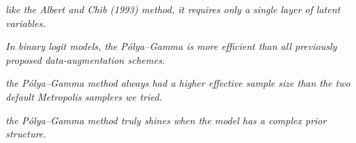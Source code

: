 \documentclass[12pt]{article}
\begin{document}
\emph{like the Albert and Chib (1993) method, it requires only a single
layer of latent variables.}

\emph{In binary logit models, the Pólya--Gamma is more efficient than
all previously proposed data-augmentation schemes.}

\emph{the Pólya--Gamma method always had a higher effective sample size
than the two default Metropolis samplers we tried. }

\emph{the Pólya--Gamma method truly shines when the model has a complex
prior structure.}



\end{document}
